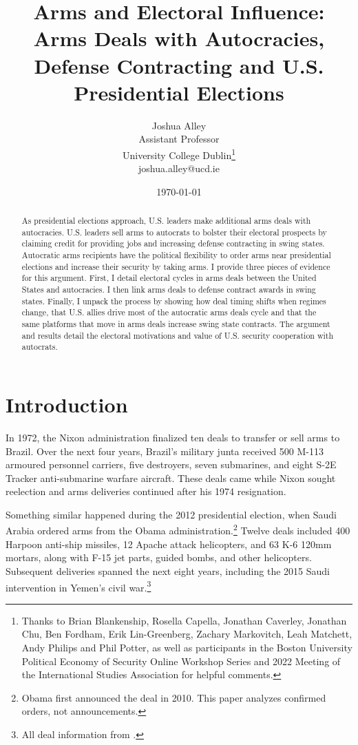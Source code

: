 \documentclass[12pt]{article}
\title{\textbf{Arms and Electoral Influence: Arms Deals with Autocracies, Defense Contracting and U.S. Presidential Elections}}
\author{Joshua Alley \\
Assistant Professor \\
University College Dublin\thanks{Thanks to Brian Blankenship, Rosella Capella, Jonathan Caverley, Jonathan Chu, Ben Fordham, Erik Lin-Greenberg, Zachary Markovitch, Leah Matchett, Andy Philips and Phil Potter, as well as participants in the Boston University Political Economy of Security Online Workshop Series and 2022 Meeting of the International Studies Association for helpful comments.} \\
joshua.alley@ucd.ie
}
\date{\today}
\begin{document}
\maketitle 

\begin{abstract} 
As presidential elections approach, U.S. leaders make additional arms deals with autocracies. 
U.S. leaders sell arms to autocrats to bolster their electoral prospects by claiming credit for providing jobs and increasing defense contracting in swing states.
Autocratic arms recipients have the political flexibility to order arms near presidential elections and increase their security by taking arms. 
I provide three pieces of evidence for this argument.  
First, I detail electoral cycles in arms deals between the United States and autocracies. 
I then link arms deals to defense contract awards in swing states.
Finally, I unpack the process by showing how deal timing shifts when regimes change, that U.S. allies drive most of the autocratic arms deals cycle and that the same platforms that move in arms deals increase swing state contracts.  
The argument and results detail the electoral motivations and value of U.S. security cooperation with autocrats. 
\end{abstract} 



\newpage 
\doublespace 


\section{Introduction}



In 1972, the Nixon administration finalized ten deals to transfer or sell arms to Brazil.
Over the next four years, Brazil's military junta received 500 M-113 armoured personnel carriers, five destroyers, seven submarines, and eight S-2E Tracker anti-submarine warfare aircraft.
These deals came while Nixon sought reelection and arms deliveries continued after his 1974 resignation. 


Something similar happened during the 2012 presidential election, when Saudi Arabia ordered arms from the Obama administration.\footnote{Obama first announced the deal in 2010. This paper analyzes confirmed orders, not announcements.} 
Twelve deals included 400 Harpoon anti-ship missiles, 12 Apache attack helicopters, and 63 K-6 120mm mortars, along with F-15 jet parts, guided bombs, and other helicopters. 
Subsequent deliveries spanned the next eight years, including the 2015 Saudi intervention in Yemen's civil war.\footnote{All deal information from \citep{SIPRI2021}.}
\end{document}
